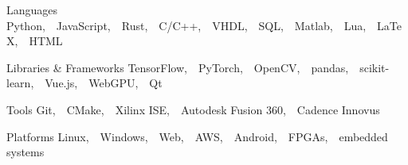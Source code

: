 

\begin{cvskills}

  \cvskill
    {Languages} %
    {Python,~~JavaScript,~~Rust,~~C/C++,~~VHDL,~~SQL,~~Matlab,~~Lua,~~LaTeX,~~HTML} %

  \cvskill
    {Libraries \& Frameworks} %
    {TensorFlow,~~PyTorch,~~OpenCV,~~pandas,~~scikit-learn,~~Vue.js,~~WebGPU,~~Qt} %

  \cvskill
    {Tools} %
    {Git,~~CMake,~~Xilinx ISE,~~Autodesk Fusion 360,~~Cadence Innovus} %

  \cvskill
    {Platforms} %
    {Linux,~~Windows,~~Web,~~AWS,~~Android,~~FPGAs,~~embedded systems} %

\end{cvskills}
